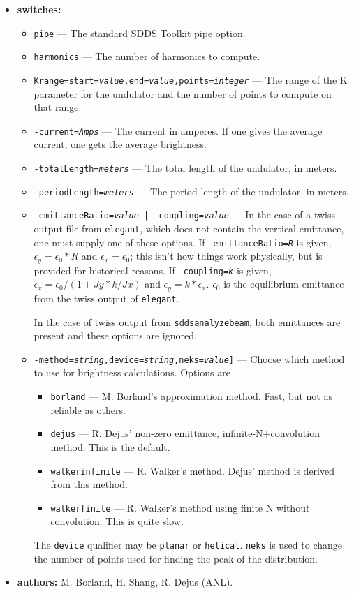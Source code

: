 \documentclass[11pt]{article}
\begin{document}
\begin{itemize}
\item {\bf switches:}
\begin{itemize}
\item {\tt pipe} --- The standard SDDS Toolkit pipe option.
\item {\tt harmonics} --- The number of harmonics to compute.
\item {\tt Krange=start={\em value},end={\em value},points={\em integer}} --- The range of the
 K parameter for the undulator and the number of points to compute on that range.
\item {\tt -current={\em Amps}} --- The current in amperes.  If one gives the average current,
 one gets the average brightness.  
\item {\tt -totalLength={\em meters}} --- The total length of the undulator, in meters.
\item {\tt -periodLength={\em meters}} ---  The period length of the undulator, in meters.
\item {\tt -emittanceRatio={\em value}  | -coupling={\em value}} --- In the case of a twiss
 output file from {\tt elegant}, which does not contain the vertical emittance, one must
 supply one of these options.  If {\tt -emittanceRatio={\em R}} is given, $\epsilon_y = \epsilon_0*R$ 
 and $\epsilon_x = \epsilon_0$; this isn't how things work physically, but is provided for historical
 reasons.
 If {\tt -coupling={\em k}} is given, $\epsilon_x = \epsilon_0/(1+Jy*k/Jx)$
 and $\epsilon_y = k*\epsilon_x$.  $\epsilon_0$ is the equilibrium emittance from the twiss output
 of {\tt elegant}.  

 In the case of twiss output from {\tt sddsanalyzebeam}, both emittances are present and these options
 are ignored.
\item {\tt -method={\em string},device={\em string},neks={\em value}]} --- Choose which method to
 use for brightness calculations.  Options are
 \begin{itemize} 
 \item {\tt borland} --- M. Borland's approximation method. Fast, but not as reliable as others.
 \item {\tt dejus} --- R. Dejus' non-zero emittance, infinite-N+convolution method.  This is the
   default.
 \item {\tt walkerinfinite} --- R. Walker's method.  Dejus' method is derived from this method.
 \item {\tt walkerfinite} --- R. Walker's method using finite N without convolution.  This is 
   quite slow.
 \end{itemize}
 The {\tt device} qualifier may be {\tt planar} or {\tt helical}.  {\tt neks} is used to 
 change the number of points used for finding the peak of the distribution.
\end{itemize}

\item {\bf authors:} M. Borland, H. Shang, R. Dejus (ANL).
\end{itemize}
\end{document}
